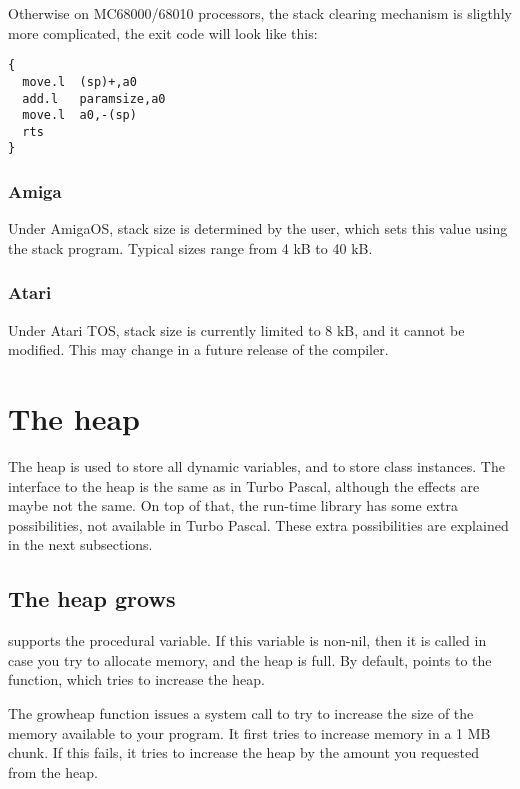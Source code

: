 Otherwise on MC68000/68010 processors, the stack clearing mechanism
is sligthly more complicated, the exit code will look like this:

\begin{verbatim}
{
  move.l  (sp)+,a0
  add.l   paramsize,a0
  move.l  a0,-(sp)
  rts
}
\end{verbatim}

\subsubsection{Amiga}

Under AmigaOS, stack size is determined by the user, which sets this
value using the stack program. Typical sizes range from 4 kB to 40 kB.

\subsubsection{Atari}

Under Atari TOS, stack size is currently limited to 8 kB, and it cannot
be modified. This may change in a future release of the compiler.

\section{The heap}
\label{se:Heap}
The heap is used to store all dynamic variables, and to store class
instances. The interface to the heap is the same as in Turbo Pascal,
although the effects are maybe not the same. On top of that, the \fpc
run-time library has some extra possibilities, not available in Turbo
Pascal. These extra possibilities are explained in the next subsections.


\subsection{The heap grows}
\fpc supports the  procedural variable. If this variable is
non-nil, then it is called in case you try to allocate memory, and the heap
is full. By default,  points to the  function,
which tries to increase the heap.

The growheap function issues a system call to try to increase the size of the
memory available to your program. It first tries to increase memory in a 1 MB
chunk. If this fails, it tries to increase the heap by the amount you
requested from the heap.

